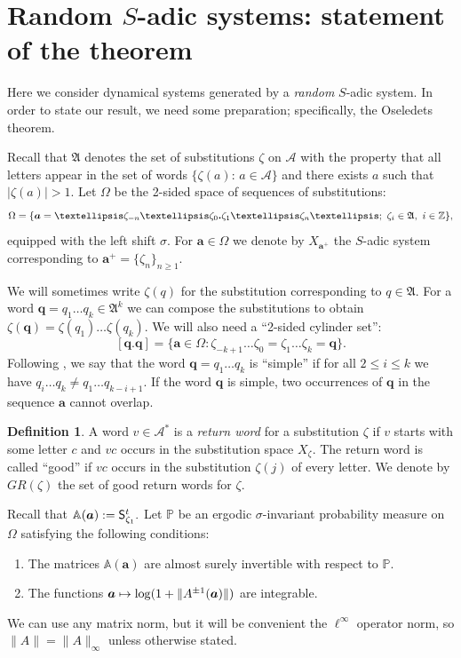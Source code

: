 \documentclass[11pt]{article}
\numberwithin{equation}{section}\newcommand{\Relation}[2][]{}\newtheorem*{prop*}{Proposition}
\let\mathcal\mathscr
\def\mto{\mathchoice{\longmapsto}{\mapsto}{\mapsto}{\mapsto}}
\newcommand{\sep}{:}
\theoremstyle{plain}
\theoremstyle{definition}
\newtheorem{defi}[theorem]{Definition}
\newcommand\bom{{\boldsymbol a}}\let\ba\bom
\newcommand\bq{{\boldsymbol q}}
\let\Om\Omega
\let\sig\sigma
\newcommand\FrA{\mathfrak{A}}
\newcommand\Ak{\mathcal{A}}
\newcommand\Aa{\mathbb{A}}
\newcommand{\Z}{\mathbb{Z}}
\renewcommand{\P}{\mathbb{P}}
\newcommand\Sf{{\sf S}}
\begin{document}
\section{Random \texorpdfstring{$S$}{S}-adic systems: statement of the theorem}\label{sec:3}

Here we consider dynamical systems generated by a \emph{random} $S$-adic system. In order to state our result, we need some preparation; specifically, the Oseledets theorem.

Recall that $\FrA$ denotes the set of substitutions $\zeta$ on $\Ak$ with the property that all letters appear in the set of words $\{\zeta(a):\,a\in \Ak\}$ and there exists $a$ such that $|\zeta(a)|>1$.
Let $\Om$ be the 2-sided space of sequences of substitutions:
\[
\Om = \{\bom = \ldots \zeta_{-n}\ldots\zeta_0{\text{\bf .}}\zeta_1\ldots \zeta_n\ldots;\ \zeta_i \in \FrA,\ i\in \Z\},
\]
equipped with the left shift $\sig$.
For $\bom\in\Om$ we denote by $X_{\bom^+}$ the $S$-adic system corresponding to $\bom^+=\{\zeta_n\}_{n\ge 1}$.

We will sometimes write $\zeta(q)$ for the substitution corresponding to $q\in \FrA$. For a word $\bq = q_1\ldots q_k\in \FrA^k$ we can compose the substitutions to obtain
$\zeta(\bq) = \zeta(q_1)\ldots \zeta(q_k)$.
We will also need a ``2-sided cylinder set'':\vspace*{-3pt}
\[
[\bq.\bq] = \{\bom\in \Om\sep \zeta_{-k+1}\ldots\zeta_0 = \zeta_1\ldots\zeta_k = \bq\}.
\]
Following \cite{BufGur}, we say that the word $\bq = q_1\ldots q_k$ is ``simple'' if for all $2 \le i \le k$ we have $q_i\ldots q_k \ne q_1\ldots q_{k-i+1}$. If the word $\bq$ is simple, two occurrences of $\bq$ in the sequence
$\bom$ cannot overlap.

\begin{defi}
A word $v\in \Ak^*$ is a \emph{return word} for a substitution $\zeta$ if $v$ starts with some letter $c$ and $vc$ occurs in the substitution space $X_\zeta$. The return word is called ``good'' if $vc$ occurs in the substitution $\zeta(j)$ of every letter. We denote by $GR(\zeta)$ the set of good return words for $\zeta$.
\end{defi}

Recall that
$
\Aa(\bom) := \Sf^t_{\zeta_1}.
$
Let $\P$ be an ergodic $\sig$-invariant probability measure on $\Om$ satisfying the following conditions:
\begin{enumerate}\renewcommand{\theenumi}{C\arabic{enumi}}
\item\label{C1}
The matrices $\Aa(\bom)$ are almost surely invertible with respect to $\P$.

\item\label{C2}
The functions $\bom\mto \log(1+ \|A^{\pm 1}(\bom)\|)$ are integrable.
\end{enumerate}
We can use any matrix norm, but it will be convenient the $\ell^\infty$ operator norm, so
$\|A\|=\|A\|_\infty$ unless otherwise stated.
\end{document}
